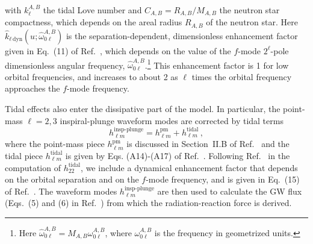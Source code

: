 \documentclass[prd,aps,letter,twocolumn,floatfix,notitlepage,nofootinbib]{revtex4-1}
\begin{document}
with $k^{A,B}_{\ell}$ the tidal Love number and $C_{A,B}=R_{A,B}/M_{A,B}$ the neutron star compactness, which depends on the areal radius $R_{A,B}$ of the neutron star. Here $\hat{k}_{\ell\,\textrm{dyn}}(u;\hat{\omega}_{0\ell}^{A,B})$ is the separation-dependent, dimensionless enhancement factor given in Eq.~(11) of Ref.~\cite{Dietrich:2017feu}, which depends on the value of the $f$-mode $2^\ell$-pole dimensionless angular frequency, $\hat{\omega}_{0\ell}^{A,B}$.\footnote{Here $\hat{\omega}_{0\ell}^{A,B}=M_{A,B}\omega_{0\ell}^{A,B}$, where $\omega_{0\ell}^{A,B}$ is the frequency in geometrized units.} This enhancement factor is 1 for low orbital frequencies, and increases to about 2 as $\ell$ times the orbital frequency approaches the $f$-mode frequency. 

Tidal effects also enter the dissipative part of the model. In particular, the point-mass $\ell=2,3$ inspiral-plunge waveform modes are corrected by tidal terms
\begin{equation}
h_{\ell m}^{\textrm{insp-plunge}} = h_{\ell m}^{\textrm{pm}} + h_{\ell m}^{\textrm{tidal}}\,,\label{hlminspplunge}
\end{equation} 
where the point-mass piece $h_{\ell m}^{\textrm{pm}}$ is discussed in Section~II.B of Ref.~\cite{Bohe:2016gbl} and the tidal piece $h_{\ell m}^{\textrm{tidal}}$ is given by Eqs. (A14)-(A17) of Ref.~\cite{Damour:2012yf}. Following Ref.~\cite{Dietrich:2017feu} in the computation of $h_{22}^{\textrm{tidal}}$, we include a dynamical enhancement factor that depends on the orbital separation and on the $f$-mode frequency, and is given in Eq.~(15) of Ref.~\cite{Dietrich:2017feu}. The waveform modes $h_{\ell m}^{\textrm{insp-plunge}}$ are then used to calculate the GW flux (Eqs.~(5) and (6) in Ref.~\cite{Dietrich:2017feu}) from which the radiation-reaction force is derived.
\end{document}
